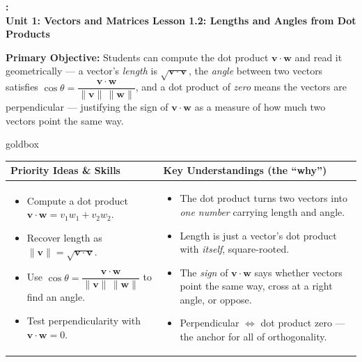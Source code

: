 \documentclass[10pt]{article}
\newcommand{\vv}{\mathbf{v}}
\newcommand{\ww}{\mathbf{w}}
\newcommand{\UnitNumberName}{Unit 1: Vectors and Matrices \quad}
\newcommand{\LessonNumberName}{Lesson 1.2: Lengths and Angles from Dot Products}
\begin{document}
\begin{center}
    {\Large\bfseries \CourseName: \SchoolYear \\
    {\small\bfseries \UnitNumberName \LessonNumberName}}
\end{center}

\begin{tcolorbox}[colback=blush, colframe=burgundy, boxrule=0.9pt, arc=2mm,
    left=2mm, right=2mm, top=1.5mm, bottom=1.5mm]
    \textbf{Primary Objective:} Students can compute the dot product $\vv\cdot\ww$ and read it
    geometrically --- a vector's \emph{length} is $\sqrt{\vv\cdot\vv}$, the \emph{angle} between
    two vectors satisfies $\cos\theta=\dfrac{\vv\cdot\ww}{\|\vv\|\,\|\ww\|}$, and a dot product of
    \emph{zero} means the vectors are perpendicular --- justifying the sign of $\vv\cdot\ww$ as a
    measure of how much two vectors point the same way.
\end{tcolorbox}

\renewcommand{\arraystretch}{1.4}
\begin{skillbox}{goldbox}
\begin{tabularx}{\linewidth}{@{}X|X@{}}
\textbf{Priority Ideas \& Skills} & \textbf{Key Understandings (the ``why'')} \\[2pt]
\hline
\vspace{-6pt}
\begin{itemize}[leftmargin=1.1em, nosep, after=\vspace{2pt}]
  \item Compute a dot product $\vv\cdot\ww=v_1w_1+v_2w_2$.
  \item Recover length as $\|\vv\|=\sqrt{\vv\cdot\vv}$.
  \item Use $\cos\theta=\dfrac{\vv\cdot\ww}{\|\vv\|\,\|\ww\|}$ to find an angle.
  \item Test perpendicularity with $\vv\cdot\ww=0$.
\end{itemize}
&
\vspace{-6pt}
\begin{itemize}[leftmargin=1.1em, nosep, after=\vspace{2pt}]
  \item The dot product turns two vectors into \emph{one number} carrying length and angle.
  \item Length is just a vector's dot product with \emph{itself}, square-rooted.
  \item The \emph{sign} of $\vv\cdot\ww$ says whether vectors point the same way, cross at a right angle, or oppose.
  \item Perpendicular $\Leftrightarrow$ dot product zero --- the anchor for all of orthogonality.
\end{itemize}
\end{tabularx}
\end{skillbox}
\end{document}
